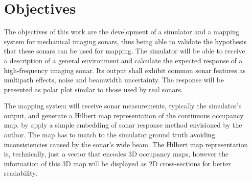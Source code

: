 

\section{Objectives}



The objectives of this work are the development of a simulator and a mapping
system for mechanical imaging sonars, thus being able to validate the hypothesis
that these sonars can be used for mapping.
The simulator will be able to receive a description of a general environment and calculate the expected response of a high-frequency imaging sonar. Its output
shall exhibit common sonar features as multipath effects, noise and beamwidth
uncertainty. The response will be presented as polar plot similar to those used
by real sonars.

The mapping system will receive sonar measurements, typically the simulator's
output, and generate a Hilbert map representation of the continuous occupancy
map, by apply a simple embedding of sonar response method envisioned by the
author.
The map has to match to the simulator ground truth avoiding inconsistencies
caused by the sonar's wide beam. The Hilbert map representation is, technically,
just a vector that encodes 3D occupancy maps, however the information of this 3D
map will be displayed as 2D cross-sections for better readability.


% 
% 

